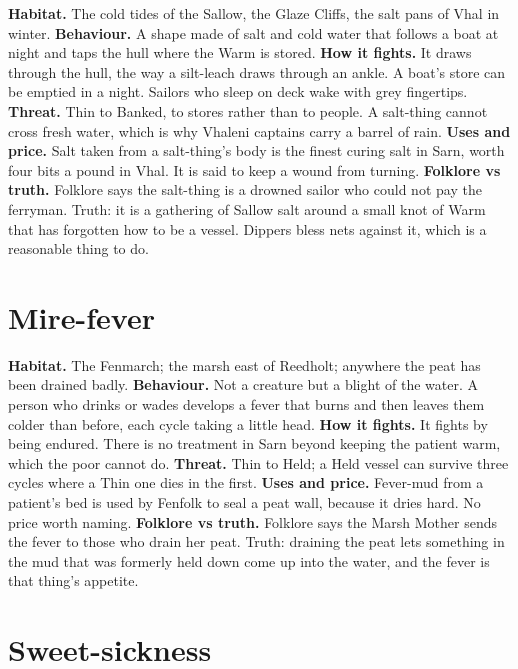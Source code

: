 \documentclass{design/chronicle}
\begin{document}
\textbf{Habitat.} The cold tides of the Sallow, the Glaze Cliffs, the salt pans of Vhal in winter. \textbf{Behaviour.} A shape made of salt and cold water that follows a boat at night and taps the hull where the Warm is stored. \textbf{How it fights.} It draws through the hull, the way a silt-leach draws through an ankle. A boat’s store can be emptied in a night. Sailors who sleep on deck wake with grey fingertips. \textbf{Threat.} Thin to Banked, to stores rather than to people. A salt-thing cannot cross fresh water, which is why Vhaleni captains carry a barrel of rain. \textbf{Uses and price.} Salt taken from a salt-thing’s body is the finest curing salt in Sarn, worth four bits a pound in Vhal. It is said to keep a wound from turning. \textbf{Folklore vs truth.} Folklore says the salt-thing is a drowned sailor who could not pay the ferryman. Truth: it is a gathering of Sallow salt around a small knot of Warm that has forgotten how to be a vessel. Dippers bless nets against it, which is a reasonable thing to do.

\section*{Mire-fever}

\textbf{Habitat.} The Fenmarch; the marsh east of Reedholt; anywhere the peat has been drained badly. \textbf{Behaviour.} Not a creature but a blight of the water. A person who drinks or wades develops a fever that burns and then leaves them colder than before, each cycle taking a little head. \textbf{How it fights.} It fights by being endured. There is no treatment in Sarn beyond keeping the patient warm, which the poor cannot do. \textbf{Threat.} Thin to Held; a Held vessel can survive three cycles where a Thin one dies in the first. \textbf{Uses and price.} Fever-mud from a patient’s bed is used by Fenfolk to seal a peat wall, because it dries hard. No price worth naming. \textbf{Folklore vs truth.} Folklore says the Marsh Mother sends the fever to those who drain her peat. Truth: draining the peat lets something in the mud that was formerly held down come up into the water, and the fever is that thing’s appetite.

\section*{Sweet-sickness}
\end{document}
